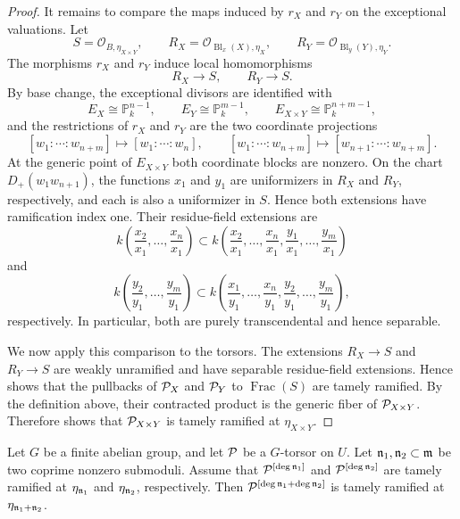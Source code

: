 \begin{proof}
It remains to compare the maps induced by $r_X$ and $r_Y$ on the exceptional
valuations. Let
\[
S=\mathcal O_{B,\eta_{X\times Y}},\qquad
R_X=\mathcal O_{\operatorname{Bl}_x(X),\eta_X},\qquad
R_Y=\mathcal O_{\operatorname{Bl}_y(Y),\eta_Y}.
\]
The morphisms $r_X$ and $r_Y$ induce local homomorphisms
\[
    R_X\longrightarrow S,
    \qquad
    R_Y\longrightarrow S.
\]
By base change, the exceptional divisors are identified with
\[
    E_X\cong\mathbb P_k^{n-1},\qquad
    E_Y\cong\mathbb P_k^{m-1},\qquad
    E_{X\times Y}\cong\mathbb P_k^{n+m-1},
\]
and the restrictions of $r_X$ and $r_Y$ are the two coordinate projections
\[
[w_1:\cdots:w_{n+m}]\longmapsto[w_1:\cdots:w_n],
\qquad
[w_1:\cdots:w_{n+m}]\longmapsto[w_{n+1}:\cdots:w_{n+m}].
\]
At the generic point of $E_{X\times Y}$ both coordinate blocks are nonzero.
On the chart $D_+(w_1w_{n+1})$, the functions $x_1$ and $y_1$ are
uniformizers in $R_X$ and $R_Y$, respectively, and each is also a
uniformizer in $S$. Hence both extensions have ramification index one. Their
residue-field extensions are
\[
k\left(\frac{x_2}{x_1},\ldots,\frac{x_n}{x_1}\right)
\subset
k\left(\frac{x_2}{x_1},\ldots,\frac{x_n}{x_1},
        \frac{y_1}{x_1},\ldots,\frac{y_m}{x_1}\right)
\]
and
\[
k\left(\frac{y_2}{y_1},\ldots,\frac{y_m}{y_1}\right)
\subset
k\left(\frac{x_1}{y_1},\ldots,\frac{x_n}{y_1},
        \frac{y_2}{y_1},\ldots,\frac{y_m}{y_1}\right),
\]
respectively. In particular, both are purely transcendental and hence
separable.

We now apply this comparison to the torsors. The extensions
$R_X\to S$ and $R_Y\to S$ are weakly unramified and have
separable residue-field extensions. Hence
 shows that the pullbacks of
$\mathcal{P}_X$ and $\mathcal{P}_Y$ to $\operatorname{Frac}(S)$ are tamely ramified.
By the definition above, their contracted product is the generic fiber of
$\mathcal{P}_{X\times Y}$. Therefore
 shows that
$\mathcal{P}_{X\times Y}$ is tamely ramified at $\eta_{X\times Y}$.
\end{proof}

\begin{cor}\label{cor:moduli-reduction}
Let $G$ be a finite abelian group, and let $\mathcal{P}$ be a $G$-torsor on $U$.
Let $\mathfrak{n}_1,\mathfrak{n}_2\subset\mathfrak{m}$ be two coprime nonzero submoduli.
Assume that $\mathcal{P}^{[\deg\mathfrak{n}_1]}$ and $\mathcal{P}^{[\deg\mathfrak{n}_2]}$ are tamely
ramified at $\eta_{\mathfrak{n}_1}$ and $\eta_{\mathfrak{n}_2}$, respectively. Then
$\mathcal{P}^{[\deg\mathfrak{n}_1+\deg\mathfrak{n}_2]}$ is tamely ramified at
$\eta_{\mathfrak{n}_1+\mathfrak{n}_2}$.
\end{cor}

